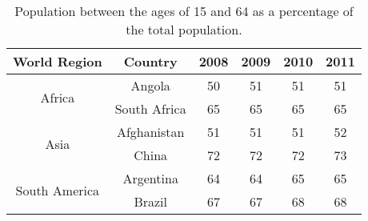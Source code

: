 \begin{enumerate}
\begin{table}[!h]
\centering
\caption{Population between the ages of 15 and 64 as a percentage of the total population.} 
\begin{tabular}{c||c|c|c|c|c}
\hline\hline
World Region             & Country        & 2008    & 2009  & 2010  & 2011\\ \hline\hline
\multirow{2}{*}{Africa}  & Angola         & 50 	    & 51    & 51    & 51\\
                         & South Africa   & 65      & 65    & 65    & 65 \\\hline
\multirow{2}{*}{Asia}    & Afghanistan    & 51      & 51    & 51    & 52\\
                         & China 	  & 72      & 72    & 72    & 73\\\hline
\multirow{2}{*}{South America}   & Argentina     & 64 	& 64 	& 65 	& 65 \\	
                                 & Brazil 	& 67 	& 67 	& 68 	&68 \\
\hline\hline
\end{tabular}
\label{tab:tab}
\end{table}


\end{enumerate}

